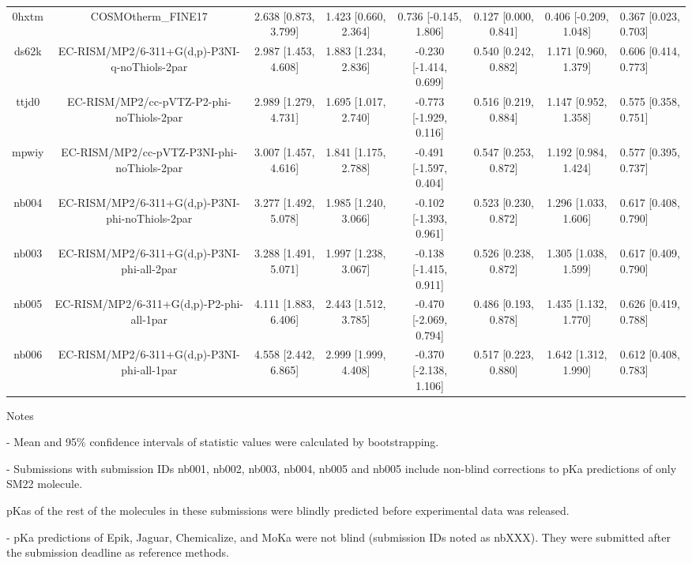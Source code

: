 \documentclass{article}
\begin{document}
\begin{center}
\begin{longtable}{|ccccccc|}
 0hxtm &                                 COSMOtherm\_FINE17 &  2.638 [0.873, 3.799] &  1.423 [0.660, 2.364] &    0.736 [-0.145, 1.806] &  0.127 [0.000, 0.841] &  0.406 [-0.209, 1.048] &   0.367 [0.023, 0.703] \\
 ds62k &      EC-RISM/MP2/6-311+G(d,p)-P3NI-q-noThiols-2par &  2.987 [1.453, 4.608] &  1.883 [1.234, 2.836] &   -0.230 [-1.414, 0.699] &  0.540 [0.242, 0.882] &   1.171 [0.960, 1.379] &   0.606 [0.414, 0.773] \\
 ttjd0 &           EC-RISM/MP2/cc-pVTZ-P2-phi-noThiols-2par &  2.989 [1.279, 4.731] &  1.695 [1.017, 2.740] &   -0.773 [-1.929, 0.116] &  0.516 [0.219, 0.884] &   1.147 [0.952, 1.358] &   0.575 [0.358, 0.751] \\
 mpwiy &         EC-RISM/MP2/cc-pVTZ-P3NI-phi-noThiols-2par &  3.007 [1.457, 4.616] &  1.841 [1.175, 2.788] &   -0.491 [-1.597, 0.404] &  0.547 [0.253, 0.872] &   1.192 [0.984, 1.424] &   0.577 [0.395, 0.737] \\
 nb004 &    EC-RISM/MP2/6-311+G(d,p)-P3NI-phi-noThiols-2par &  3.277 [1.492, 5.078] &  1.985 [1.240, 3.066] &   -0.102 [-1.393, 0.961] &  0.523 [0.230, 0.872] &   1.296 [1.033, 1.606] &   0.617 [0.408, 0.790] \\
 nb003 &         EC-RISM/MP2/6-311+G(d,p)-P3NI-phi-all-2par &  3.288 [1.491, 5.071] &  1.997 [1.238, 3.067] &   -0.138 [-1.415, 0.911] &  0.526 [0.238, 0.872] &   1.305 [1.038, 1.599] &   0.617 [0.409, 0.790] \\
 nb005 &           EC-RISM/MP2/6-311+G(d,p)-P2-phi-all-1par &  4.111 [1.883, 6.406] &  2.443 [1.512, 3.785] &   -0.470 [-2.069, 0.794] &  0.486 [0.193, 0.878] &   1.435 [1.132, 1.770] &   0.626 [0.419, 0.788] \\
 nb006 &         EC-RISM/MP2/6-311+G(d,p)-P3NI-phi-all-1par &  4.558 [2.442, 6.865] &  2.999 [1.999, 4.408] &   -0.370 [-2.138, 1.106] &  0.517 [0.223, 0.880] &   1.642 [1.312, 1.990] &   0.612 [0.408, 0.783] \\
\end{longtable}
\end{center}

Notes

- Mean and 95\% confidence intervals of statistic values were calculated by bootstrapping.

- Submissions with submission IDs nb001, nb002, nb003, nb004, nb005 and nb005 include non-blind corrections to pKa predictions of only SM22 molecule.

pKas of the rest of the molecules in these submissions were blindly predicted before experimental data was released.

- pKa predictions of Epik, Jaguar, Chemicalize, and MoKa were not blind (submission IDs noted as nbXXX). They were submitted after the submission deadline as reference methods.
\end{document}
